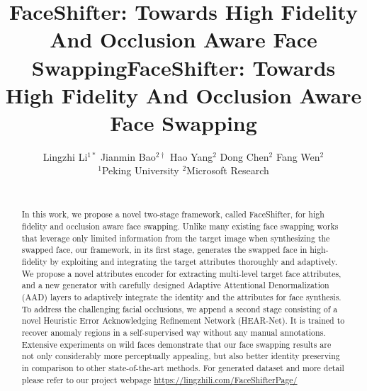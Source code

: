 \title{FaceShifter: Towards High Fidelity And Occlusion Aware Face Swapping}



\title{FaceShifter: Towards High Fidelity And Occlusion Aware Face Swapping}
\author{Lingzhi Li$^{1*}$ \qquad Jianmin Bao$^{2\dag}$ \qquad Hao Yang$^{2}$ \qquad Dong Chen$^{2}$ \qquad Fang Wen$^{2}$ \qquad \vspace{1pt}\\
$^{1}$Peking University  \qquad $^{2}$Microsoft Research\qquad\qquad\\
\hspace{0.1in}{\tt\small lilingzhi@pku.edu.cn}  \\
}


\maketitle

\begin{abstract}
In this work, we propose a novel two-stage framework, called FaceShifter, for high fidelity and occlusion aware face swapping. 
Unlike many existing face swapping works that leverage only limited information from the target image when synthesizing the swapped face, 
our framework, in its first stage, generates the swapped face in high-fidelity by exploiting and integrating the target attributes thoroughly and adaptively. 
We propose a novel attributes encoder for extracting multi-level target face attributes, and a new generator with carefully designed Adaptive Attentional Denormalization (AAD) layers to adaptively integrate the identity and the attributes for face synthesis. 
To address the challenging facial occlusions, we append a second stage consisting of a novel Heuristic Error Acknowledging Refinement Network (HEAR-Net). It is trained to recover anomaly regions in a self-supervised way without any manual annotations. 
Extensive experiments on wild faces demonstrate that our face swapping results are not only considerably more perceptually appealing, but also better identity preserving in comparison to other state-of-the-art methods. For generated dataset and more detail please refer to our project webpage \url{https://lingzhili.com/FaceShifterPage/} {\let\thefootnote\relax{}}
{\let\thefootnote\relax{}}
\end{abstract}

